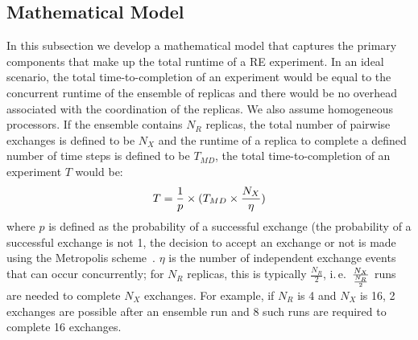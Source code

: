 \documentclass{rspublic}
\newcommand{\jhanote}[1]{ {\textcolor{red} { ***shantenu: #1 }}}
\newcommand{\alnote}[1]{ {\textcolor{blue} { ***andre: #1 }}}
\newcommand{\athotanote}[1]{ {\textcolor{green} { ***athota: #1 }}}
\newcommand{\alnote}[1]{}
\newcommand{\athotanote}[1]{}
\newcommand{\jhanote}[1]{}
\begin{document}

\subsection{Mathematical Model}
\label{sec:math-model}
In this subsection we develop a mathematical model that captures
the primary components that make up the total runtime of a RE
experiment. In an ideal scenario, the total time-to-completion of an
experiment would be equal to the concurrent runtime of the ensemble of
replicas and there would be no overhead associated with the
coordination of the replicas. We also assume homogeneous processors. If the ensemble contains $N_R$
replicas, the total number of pairwise exchanges is defined to be $N_X$ and the
runtime of a replica to complete a defined number of time steps is defined to be
$T_{MD}$, the total time-to-completion of an experiment $T$ would
be:
\begin{eqnarray}
T = {1\over p} \times (T_{MD} \times  {N_X \over \eta}) %
\label{eq:totaltime1}
\end{eqnarray}
where $p$ is defined as the probability of a successful exchange (the
probability of a successful exchange is not 1, the decision to accept
an exchange or not is made using the Metropolis
scheme~\citep{metropolis:1087}. 
$\eta$ is the number of independent exchange events that can occur 
concurrently; for $N_R$ replicas, this is typically $\frac{N_R}{2}$,
i.\,e.\ $N_X \over {N_R \over 2}$ runs are needed to complete 
$N_X$ exchanges. For example, if $N_R$ 
is 4 and $N_X$ is 16, 2 exchanges are possible after an ensemble run 
and 8 such runs are required to complete 16 exchanges. 
\end{document}
